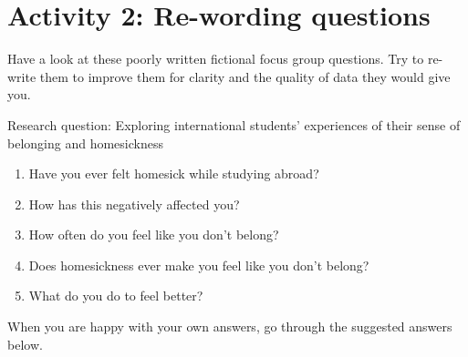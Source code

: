 \documentclass[
  english,
  letterpaper,
  DIV=11,
  numbers=noendperiod]{scrreprt}
\providecommand{\tightlist}{%
  \setlength{\itemsep}{0pt}\setlength{\parskip}{0pt}}
\begin{document}
\section{Activity 2: Re-wording
questions}\label{activity-2-re-wording-questions}

Have a look at these poorly written fictional focus group questions. Try
to re-write them to improve them for clarity and the quality of data
they would give you.

Research question: Exploring international students' experiences of
their sense of belonging and homesickness

\begin{enumerate}
\def\labelenumi{\arabic{enumi}.}
\tightlist
\item
  Have you ever felt homesick while studying abroad?
\item
  How has this negatively affected you?
\item
  How often do you feel like you don't belong?
\item
  Does homesickness ever make you feel like you don't belong?
\item
  What do you do to feel better?
\end{enumerate}

When you are happy with your own answers, go through the suggested
answers below.
\end{document}

